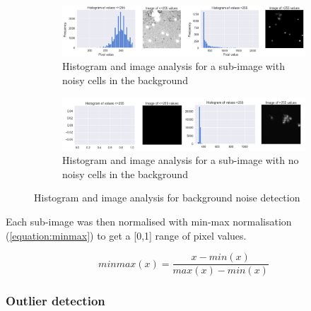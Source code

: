 \begin{figure}[h!]
    \centering
    \begin{subfigure}[h!]{0.99\textwidth}
        \includegraphics[width=\textwidth]{dissertation/figures/background_noise_true.png}
        \caption{Histogram and image analysis for a sub-image with noisy cells in the background}
        \label{fig:bgnoisetrue}
    \end{subfigure}

    \begin{subfigure}[h!]{0.99\textwidth}
        \includegraphics[width=\textwidth]{dissertation/figures/background_noise_false.png}
        \caption{Histogram and image analysis for a sub-image with no noisy cells in the background}
        \label{fig:bgnoisefalse}
    \end{subfigure}

    \caption{Histogram and image analysis for background noise detection}
    \label{fig:bgnoise}

\end{figure}

Each sub-image was then normalised with min-max normalisation (\autoref{equation:minmax}) to get a [0,1] range of pixel values.

\begin{equation}
    minmax(x) = \frac{x - min(x)}{max(x) - min(x)}
\label{equation:minmax}
\end{equation}

\bigskip
\subsubsection{Outlier detection}

